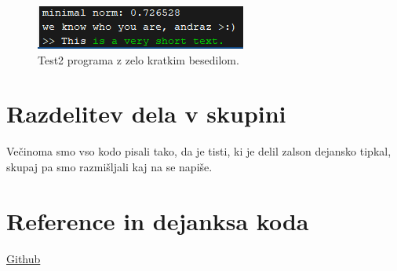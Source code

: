 \documentclass[12pt]{article}
\begin{document}
\begin{figure}[h]
             \centering
             \includegraphics{wrong_guy}
             \caption{Test2 programa z zelo kratkim besedilom.}
\end{figure}

\section{Razdelitev dela v skupini}
Večinoma smo vso kodo pisali tako, da je tisti, ki je delil zalson dejansko tipkal,
skupaj pa smo razmišljali kaj na se napiše. 
\section{Reference in dejanksa koda}
\href{https://github.com/leonleon123/prepoznavanje_uporabnika_tipkovnice}{Github}
\end{document}
